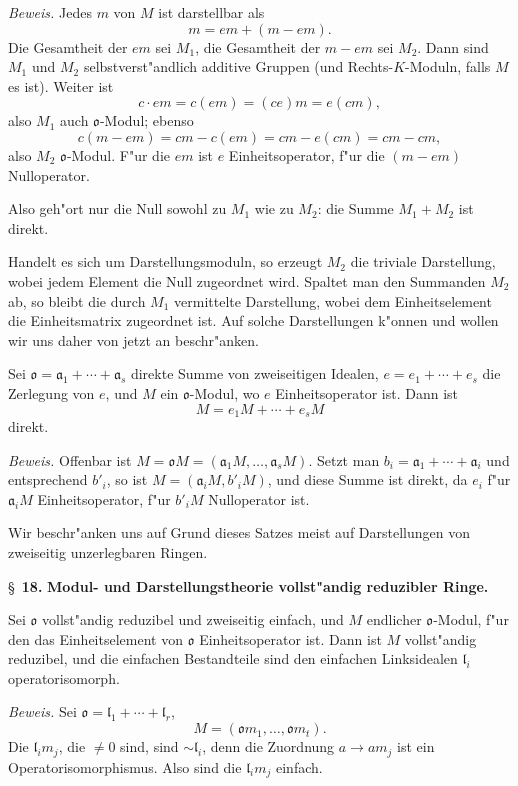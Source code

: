 \documentclass[12pt,a4paper]{article}
\theoremstyle{plain}
\begin{document}
\noindent\textit{Beweis.}
Jedes $m$ von $M$ ist darstellbar als
\[
m = em + (m - em).
\]
Die Gesamtheit der $em$ sei $M_1$, die Gesamtheit der $m-em$ sei $M_2$. Dann sind $M_1$ und $M_2$ selbstverst"andlich additive Gruppen (und Rechts-$K$-Moduln, falls $M$ es ist). Weiter ist
\[
c \cdot em = c(em) = (ce)m = e(cm),
\]
also $M_1$ auch $\mathfrak{o}$-Modul; ebenso
\[
c(m - em) = cm - c(em) = cm - e(cm) = cm - cm,
\]
also $M_2$ $\mathfrak{o}$-Modul. F"ur die $em$ ist $e$ Einheitsoperator, f"ur die $(m-em)$ Nulloperator.

Also geh"ort nur die Null sowohl zu $M_1$ wie zu $M_2$: die Summe $M_1 + M_2$ ist direkt.

Handelt es sich um Darstellungsmoduln, so erzeugt $M_2$ die triviale Darstellung, wobei jedem Element die Null zugeordnet wird. Spaltet man den Summanden $M_2$ ab, so bleibt die durch $M_1$ vermittelte Darstellung, wobei dem Einheitselement die Einheitsmatrix zugeordnet ist. Auf solche Darstellungen k"onnen und wollen wir uns daher von jetzt an beschr"anken.

\medskip
Sei $\mathfrak{o} = \mathfrak{a}_1 + \cdots + \mathfrak{a}_s$ direkte Summe von zweiseitigen Idealen, $e = e_1 + \cdots + e_s$ die Zerlegung von $e$, und $M$ ein $\mathfrak{o}$-Modul, wo $e$ Einheitsoperator ist. Dann ist
\[
M = e_1M + \cdots + e_sM
\]
direkt.

\noindent\textit{Beweis.}
Offenbar ist $M = \mathfrak{o}M = (\mathfrak{a}_1M,\ldots,\mathfrak{a}_sM)$.
Setzt man $b_i = \mathfrak{a}_1 + \cdots + \mathfrak{a}_i$ und entsprechend $b'_i$, so ist $M = (\mathfrak{a}_iM, b'_iM)$, und diese Summe ist direkt, da $e_i$ f"ur $\mathfrak{a}_iM$ Einheitsoperator, f"ur $b'_iM$ Nulloperator ist.

Wir beschr"anken uns auf Grund dieses Satzes meist auf Darstellungen von zweiseitig unzerlegbaren Ringen.

\newpage
\S~\textbf{18.}
\textbf{Modul- und Darstellungstheorie vollst"andig reduzibler Ringe.}

\smallskip

\noindent
Sei $\mathfrak{o}$ vollst"andig reduzibel und zweiseitig einfach, und $M$ endlicher $\mathfrak{o}$-Modul, f"ur den das Einheitselement von $\mathfrak{o}$ Einheitsoperator ist. Dann ist $M$ vollst"andig reduzibel, und die einfachen Bestandteile sind den einfachen Linksidealen $\mathfrak{l}_i$ operatorisomorph.

\noindent\textit{Beweis.}
Sei $\mathfrak{o} = \mathfrak{l}_1 + \cdots + \mathfrak{l}_r$,
\[
M = (\mathfrak{o}m_1,\ldots,\mathfrak{o}m_t).\tag{4}
\]
Die $\mathfrak{l}_im_j$, die $\neq 0$ sind, sind $\sim \mathfrak{l}_i$, denn die Zuordnung $a \to am_j$ ist ein Operatorisomorphismus. Also sind die $\mathfrak{l}_im_j$ einfach.
\end{document}
